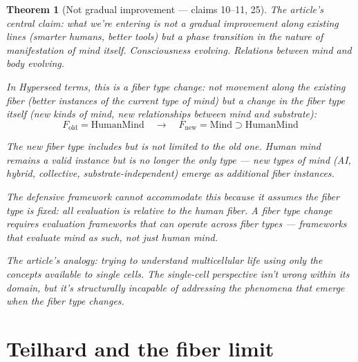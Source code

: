 \documentclass[11pt,a4paper]{article}
\newtheorem{theorem}[definition]{Theorem}
\begin{document}
\begin{theorem}[Not gradual improvement --- claims 10--11, 25]
\label{thm:phase}
The article's central claim: what we're entering is not a gradual
improvement along existing lines (smarter humans, better tools) but
a \emph{phase transition in the nature of manifestation of mind itself}.
Consciousness evolving. Relations between mind and body evolving.

In Hyperseed terms, this is a \emph{fiber type change}: not movement
along the existing fiber (better instances of the current type of
mind) but a change in the fiber type itself (new kinds of mind, new
relationships between mind and substrate):
\[
  F_{\text{old}} = \text{HumanMind} \quad \to \quad
  F_{\text{new}} = \text{Mind} \supset \text{HumanMind}
\]

The new fiber type includes but is not limited to the old one.
Human mind remains a valid instance but is no longer the only type
--- new types of mind (AI, hybrid, collective, substrate-independent)
emerge as additional fiber instances.

The defensive framework cannot accommodate this because it assumes
the fiber type is fixed: all evaluation is relative to the human
fiber. A fiber type change requires evaluation frameworks that can
operate across fiber types --- frameworks that evaluate mind \emph{as
such}, not just human mind.

The article's analogy: trying to understand multicellular life using
only the concepts available to single cells. The single-cell
perspective isn't wrong within its domain, but it's structurally
incapable of addressing the phenomena that emerge when the fiber
type changes.
\end{theorem}

\section{Teilhard and the fiber limit}
\label{sec:teilhard}
\end{document}

